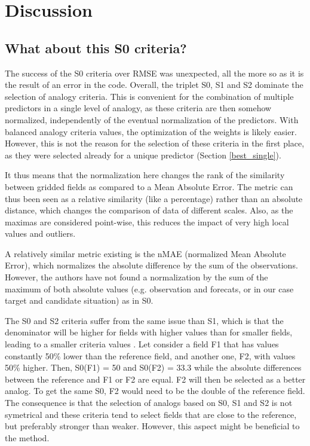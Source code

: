 \documentclass[draft]{agujournal2019}
\begin{document}



\section{Discussion}
\label{discussion}

\subsection{What about this S0 criteria?}
\label{discussion_S0}

The success of the S0 criteria over RMSE was unexpected, all the more so as it is the result of an error in the code. Overall, the triplet S0, S1 and S2 dominate the selection of analogy criteria. This is convenient for the combination of multiple predictors in a single level of analogy, as these criteria are then somehow normalized, independently of the eventual normalization of the predictors. With balanced analogy criteria values, the optimization of the weights is likely easier. However, this is not the reason for the selection of these criteria in the first place, as they were selected already for a unique predictor (Section \ref{best_single}). 

It thus means that the normalization here changes the rank of the similarity between gridded fields as compared to a Mean Absolute Error. The metric can thus been seen as a relative similarity (like a percentage) rather than an absolute distance, which changes the comparison of data of different scales. Also, as the maximas are considered point-wise, this reduces the impact of very high local values and outliers.

A relatively similar metric existing is the nMAE (normalized Mean Absolute Error), which normalizes the absolute difference by the sum of the observations. However, the authors have not found a normalization by the sum of the maximum of both absolute values (e.g. observation and forecats, or in our case target and candidate situation) as in S0.

The S0 and S2 criteria suffer from the same issue than S1, which is that the denominator will be higher for fields with higher values than for smaller fields, leading to a smaller criteria values \cite{Thompson1972}. Let consider a field F1 that has values constantly 50\% lower than the reference field, and another one, F2, with values 50\% higher. Then, S0(F1) = 50 and S0(F2) = 33.3 while the absolute differences between the reference and F1 or F2 are equal. F2 will then be selected as a better analog. To get the same S0, F2 would need to be the double of the reference field. The consequence is that the selection of analogs based on S0, S1 and S2 is not symetrical and these criteria tend to select fields that are close to the reference, but preferably stronger than weaker. However, this aspect might be beneficial to the method.
\end{document}
